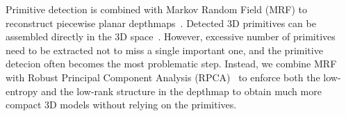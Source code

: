 Primitive detection is combined with Markov Random Field (MRF) to
reconstruct piecewise planar depthmaps~\cite{ManhattanWorldStereo}.
Detected 3D primitives can be assembled directly in the 3D
space~\cite{eccv_museum}.  However, excessive number of
primitives need to be extracted not to miss a single important one, and
the primitive detecion often becomes the most problematic step. Instead,
we combine MRF with Robust Principal Component Analysis
(RPCA)~\cite{Candes2011} to enforce both the low-entropy and the low-rank
structure in the depthmap to obtain much more compact 3D
models without relying on the primitives.

%
%



